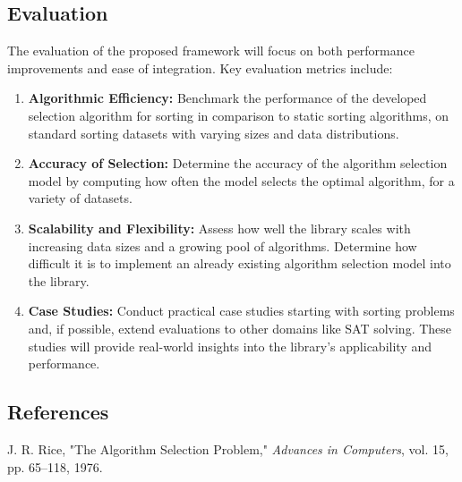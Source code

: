 \documentclass[twocolumn]{article}
\begin{document}
\subsection*{Evaluation}

The evaluation of the proposed framework will focus on both performance improvements and ease of integration. Key evaluation metrics include:

\begin{enumerate}
    \item \textbf{Algorithmic Efficiency:}  
    Benchmark the performance of the developed selection algorithm for sorting in comparison to static sorting algorithms, on standard sorting datasets with varying sizes and data distributions.
    
    \item \textbf{Accuracy of Selection:}  
    Determine the accuracy of the algorithm selection model by computing how often the model selects the optimal algorithm, for a variety of datasets.
    
    \item \textbf{Scalability and Flexibility:}  
    Assess how well the library scales with increasing data sizes and a growing pool of algorithms. Determine how difficult it is to implement an already existing algorithm selection model into the library.
    
    \item \textbf{Case Studies:}  
    Conduct practical case studies starting with sorting problems and, if possible, extend evaluations to other domains like SAT solving. These studies will provide real-world insights into the library's applicability and performance.
\end{enumerate}

\renewcommand{\refname}{}
\subsection*{References}\vspace{-3em}
\begin{thebibliography}{9}

J. R. Rice,
\newblock "The Algorithm Selection Problem,"
\newblock \emph{Advances in Computers}, vol. 15, pp. 65--118, 1976.

\end{thebibliography}
\end{document}
